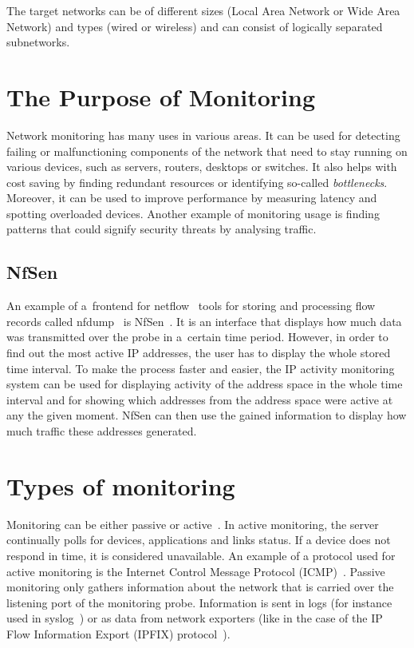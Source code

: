 The target networks can be of different sizes (Local Area Network or Wide Area Network) and types (wired or wireless) and can consist of logically separated subnetworks. 

\section{The Purpose of Monitoring}
Network monitoring has many uses in various areas.
It can be used for detecting failing or malfunctioning components of the network that need to stay
running on various devices, such as servers, routers, desktops or switches. It also helps with cost saving by finding redundant resources or identifying
so-called \textit{bottlenecks}. Moreover, it can be used to improve performance by measuring
latency and spotting overloaded devices. Another example of monitoring usage is finding patterns that could signify security threats by analysing traffic.

\subsection{NfSen}\label{sec:nfsen}
An example of a~frontend for netflow~\cite{netflow} tools for storing and processing flow records called nfdump~\cite{nfdump} is NfSen~\cite{nfsen}.
It is an interface that displays how much data was transmitted over the probe in a~certain
time period. However, in order to find out the most active IP addresses, the user has to display the whole stored time interval.
To make the process faster and easier, the IP activity monitoring system can be used for displaying activity of the address space
in the whole time interval and for showing which addresses from the address space were active at
any the given moment. NfSen can then use the gained information to display how much traffic these addresses generated.

\section{Types of monitoring}
Monitoring can be either passive or active~\cite{isa_pa}. 
In active monitoring, the server continually polls for devices, applications and links status.
If a device does not respond in time, it is considered unavailable.
An example of a protocol used for active monitoring is the Internet Control Message Protocol (ICMP)~\cite{icmp}.
Passive monitoring only gathers information about the network that is carried over the listening port of the monitoring probe.
Information is sent in logs (for instance used in syslog~\cite{syslog}) or as data from network exporters
(like in the case of the IP Flow Information Export (IPFIX) protocol~\cite{ipfix}).


